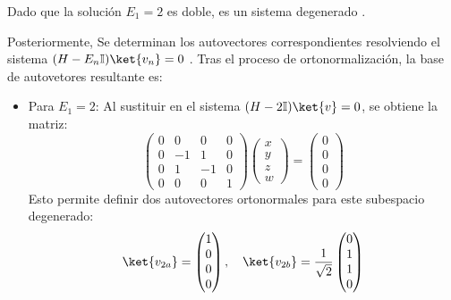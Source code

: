 \documentclass[11pt,a4paper,spanish]{book}
\begin{document}
Dado que la solución $E_1 = 2$ es doble, es un sistema degenerado \citep{vonneumann1932}.

Posteriormente, Se determinan los autovectores correspondientes resolviendo el sistema $(H - E_n\mathbb{I})\ket{v_n} = 0$ \citep{dirac1930}. Tras el proceso de ortonormalización, la base de autovetores resultante es:

\begin{itemize}
  \item Para $E_1 = 2$:
  Al sustituir en el sistema $(H - 2\mathbb{I})\ket{v} = 0$, se obtiene la matriz:
  \begin{equation}
  \begin{pmatrix} 0 & 0 & 0 & 0 \\ 0 & -1 & 1 & 0 \\ 0 & 1 & -1 & 0 \\ 0 & 0 & 0 & 1 \end{pmatrix} \begin{pmatrix} x \\ y \\ z \\ w \end{pmatrix} = \begin{pmatrix} 0 \\ 0 \\ 0 \\ 0 \end{pmatrix}
  \end{equation}
  Esto permite definir dos autovectores ortonormales para este subespacio degenerado:
  \begin{equation}
  \ket{v_{2a}} = \begin{pmatrix} 1 \\ 0 \\ 0 \\ 0 \end{pmatrix}, \quad \ket{v_{2b}} = \frac{1}{\sqrt{2}} \begin{pmatrix} 0 \\ 1 \\ 1 \\ 0 \end{pmatrix}
  \end{equation}


\end{itemize}
\end{document}
